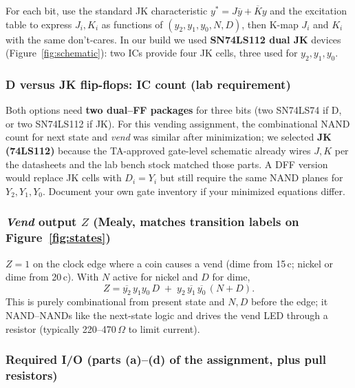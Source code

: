 \documentclass[12pt, letterpaper]{article}
\begin{document}
For each bit, use the standard JK characteristic $y^* = J\overline{y} + \overline{K}y$ and the
excitation table to express $J_i,K_i$ as functions of $(y_2,y_1,y_0,N,D)$, then K-map $J_i$
and $K_i$ with the same don't-cares.  In our build we used \textbf{SN74LS112 dual JK} devices
(Figure~\ref{fig:schematic}): two ICs provide four JK cells, three used for $y_2,y_1,y_0$.

\subsubsection*{D versus JK flip-flops: IC count (lab requirement)}

Both options need \textbf{two dual--FF packages} for three bits (two SN74LS74 if D, or two
SN74LS112 if JK).  For this vending assignment, the combinational NAND count for next state
and \textit{vend} was similar after minimization; we selected \textbf{JK (74LS112)} because
the TA-approved gate-level schematic already wires $J,K$ per the datasheets and the lab
bench stock matched those parts.  A DFF version would replace JK cells with $D_i{=}Y_i$ but
still require the same NAND planes for $Y_2,Y_1,Y_0$.  Document your own gate inventory if
your minimized equations differ.

\subsubsection*{\textit{Vend} output $Z$ (Mealy, matches transition labels on Figure~\ref{fig:states})}

$Z{=}1$ on the clock edge where a coin causes a vend (dime from 15\,c; nickel or dime from
20\,c).  With $N$ active for nickel and $D$ for dime,
\begin{equation}
  Z = \overline{y_2}\,y_1 y_0\,D \;+\; y_2\,\overline{y_1}\,\overline{y_0}\,(N + D).
\end{equation}
This is purely combinational from present state and $N,D$ before the edge; it NAND--NANDs
like the next-state logic and drives the vend LED through a resistor (typically
220--470\,$\Omega$ to limit current).

\subsubsection*{Required I/O (parts (a)--(d) of the assignment, plus pull resistors)}
\end{document}
